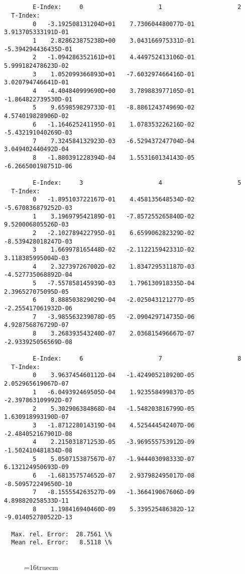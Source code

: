 \documentclass[12pt,dvipdfmx]{article}
\begin{document}
\begin{small}\begin{verbatim}


        E-Index:     0                     1                     2
  T-Index:
        0   -3.192508131204D+01    7.730604480077D-01    3.913705333191D-01
        1    2.828623875238D+00    3.043166975331D-01   -5.394294436435D-01
        2   -1.094286352161D+01    4.449752413106D-01    5.999182478623D-02
        3    1.052099366893D+01   -7.603297466416D-01    3.020794746641D-01
        4   -4.404840999690D+00    3.789883977105D-01   -1.864822739530D-01
        5    9.659859829733D-01   -8.886124374969D-02    4.574019828906D-02
        6   -1.164625241195D-01    1.078353226216D-02   -5.432191040269D-03
        7    7.324584132923D-03   -6.529437247704D-04    3.049402440492D-04
        8   -1.880391228394D-04    1.553160134143D-05   -6.266500198751D-06

        E-Index:     3                     4                     5
  T-Index:
        0   -1.895103722167D-01    4.458135648534D-02   -5.670836879252D-03
        1    3.196979542189D-01   -7.857255265840D-02    9.520006805526D-03
        2   -2.102789422795D-01    6.659906282329D-02   -8.539428018247D-03
        3    1.669978165448D-02   -2.112215942331D-02    3.118385995004D-03
        4    2.327397267002D-02    1.834729531187D-03   -4.527735068892D-04
        5   -7.557858145939D-03    1.796130918335D-04    2.396527075095D-05
        6    8.888503829029D-04   -2.025043121277D-05   -2.255417061932D-06
        7   -3.985563239078D-05   -2.090429714735D-06    4.928756876729D-07
        8    3.268393543240D-07    2.036815496667D-07   -2.933925056569D-08

        E-Index:     6                     7                     8
  T-Index:
        0    3.963745460112D-04   -1.424905218920D-05    2.052965619067D-07
        1   -6.049392469505D-04    1.923558499837D-05   -2.397863109992D-07
        2    5.302906384868D-04   -1.548203816799D-05    1.630918993190D-07
        3   -1.871228014319D-04    4.525444542407D-06   -2.484052167901D-08
        4    2.215031871253D-05   -3.969555753912D-09   -1.502410481834D-08
        5    5.050715387567D-07   -1.944403098333D-07    6.132124950693D-09
        6   -1.681357574652D-07    2.937982495017D-08   -8.509572249650D-10
        7   -8.155554263527D-09   -1.366419067606D-09    4.898820258533D-11
        8    1.198416940460D-09    5.339525486382D-12   -9.014052780522D-13

  Max. rel. Error:  28.7561 \%
  Mean rel. Error:   8.5118 \%


\end{verbatim}\end{small}
\begin{figure} \label{2.3.2d}
\epsfxsize=16truecm
\end{figure}
\newpage
\end{document}
